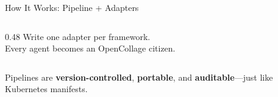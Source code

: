 \begin{frame}[fragile]{How It Works: Pipeline + Adapters}
\begin{columns}[T]
\begin{column}{0.48\textwidth}
      \vspace{0.1cm}
      \fontsize{6}{7}\selectfont
      Write one adapter per framework.\\
      Every agent becomes an OpenCollage citizen.
    \end{column}
  \end{columns}

  \vspace{-0.4cm}

  \begin{exampleblock}{}
    \centering\scriptsize
    Pipelines are \textbf{version-controlled}, \textbf{portable}, and \textbf{auditable}---just like Kubernetes manifests.
  \end{exampleblock}
\end{frame}
